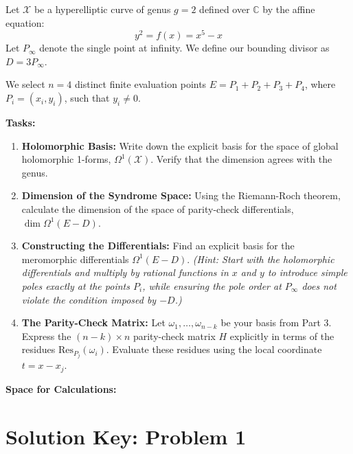 \documentclass[11pt, a4paper, twoside]{article}
\newcommand{\C}{\mathbb{C}}
\newcommand{\X}{\mathcal{X}}
\begin{document}
	\begin{problembox}
		Let $\X$ be a hyperelliptic curve of genus $g=2$ defined over $\C$ by the affine equation:
		$$ y^2 = f(x) = x^5 - x $$
		Let $P_\infty$ denote the single point at infinity. We define our bounding divisor as $D = 3P_\infty$. 
		
		We select $n=4$ distinct finite evaluation points $E = P_1 + P_2 + P_3 + P_4$, where $P_i = (x_i, y_i)$, such that $y_i \neq 0$.
		
		\vspace{0.5em}
		\textbf{Tasks:}
		\begin{enumerate}
			\item \textbf{Holomorphic Basis:} Write down the explicit basis for the space of global holomorphic 1-forms, $\Omega^1(\X)$. Verify that the dimension agrees with the genus.
			\item \textbf{Dimension of the Syndrome Space:} Using the Riemann-Roch theorem, calculate the dimension of the space of parity-check differentials, $\dim \Omega^1(E-D)$.
			\item \textbf{Constructing the Differentials:} Find an explicit basis for the meromorphic differentials $\Omega^1(E-D)$. \textit{(Hint: Start with the holomorphic differentials and multiply by rational functions in $x$ and $y$ to introduce simple poles exactly at the points $P_i$, while ensuring the pole order at $P_\infty$ does not violate the condition imposed by $-D$.)}
			\item \textbf{The Parity-Check Matrix:} Let $\omega_1, \dots, \omega_{n-k}$ be your basis from Part 3. Express the $(n-k) \times n$ parity-check matrix $H$ explicitly in terms of the residues $\text{Res}_{P_j}(\omega_i)$. Evaluate these residues using the local coordinate $t = x - x_j$.
		\end{enumerate}
	\end{problembox}
	
	\vspace{1.5em}
	\noindent\textbf{Space for Calculations:}
	
	\newpage
	
	\section*{Solution Key: Problem 1}
	
\end{document}
